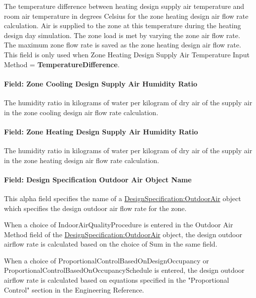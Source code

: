 The temperature difference between heating design supply air temperature and room air temperature in degrees Celsius for the zone heating design air flow rate calculation. Air is supplied to the zone at this temperature during the heating design day simulation. The zone load is met by varying the zone air flow rate. The maximum zone flow rate is saved as the zone heating design air flow rate. This field is only used when Zone Heating Design Supply Air Temperature Input Method = \textbf{TemperatureDifference}.

\paragraph{Field: Zone Cooling Design Supply Air Humidity Ratio}\label{field-zone-cooling-design-supply-air-humidity-ratio}

The humidity ratio in kilograms of water per kilogram of dry air of the supply air in the zone cooling design air flow rate calculation.

\paragraph{Field: Zone Heating Design Supply Air Humidity Ratio}\label{field-zone-heating-design-supply-air-humidity-ratio}

The humidity ratio in kilograms of water per kilogram of dry air of the supply air in the zone heating design air flow rate calculation.

\paragraph{Field: Design Specification Outdoor Air Object Name}\label{field-design-specification-outdoor-air-object-name-000}

This alpha field specifies the name of a \hyperref[designspecificationoutdoorair]{DesignSpecification:OutdoorAir} object which specifies the design outdoor air flow rate for the zone.

When a choice of IndoorAirQualityProcedure is entered in the Outdoor Air Method field of the \hyperref[designspecificationoutdoorair]{DesignSpecification:OutdoorAir} object, the design outdoor airflow rate is calculated based on the choice of Sum in the same field.

When a choice of ProportionalControlBasedOnDesignOccupancy or ProportionalControlBasedOnOccupancySchedule is entered, the design outdoor airflow rate is calculated based on equations specified in the "Proportional Control" section in the Engineering Reference.

